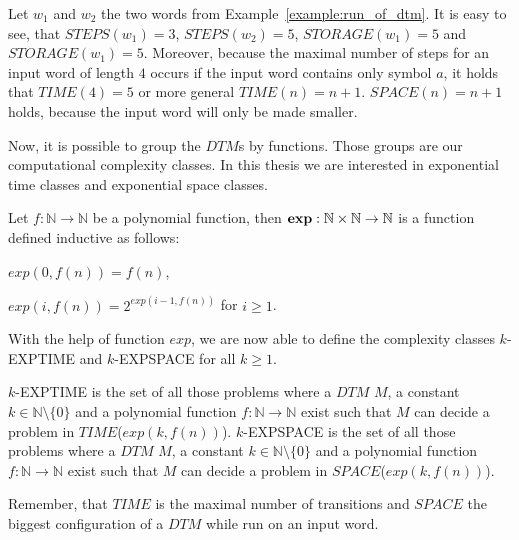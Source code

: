 \begin{example}
    \label{example:time_and_space}
    Let $w_1$ and $w_2$ the two words from Example~\ref{example:run_of_dtm}. It is easy to see, that $\mathit{STEPS}
    (w_1) = 3$, $\mathit{STEPS}(w_2) = 5$, $\mathit{STORAGE}(w_1) = 5$ and $\mathit{STORAGE}(w_1) = 5$. Moreover,
    because the maximal number of steps for an input word of length $4$ occurs if the input word contains only symbol
    $a$, it holds that $\mathit{TIME}(4) = 5$ or more general $\mathit{TIME}(n) = n + 1$. $\mathit{SPACE}(n) = n + 1$
    holds, because the input word will only be made smaller.
\end{example}

Now, it is possible to group the $\mathit{DTM}$s by functions. Those groups are our computational complexity classes.
In this thesis we are interested in exponential time classes and exponential space classes.

\begin{definition}
    Let $f: \mathbb{N} \rightarrow \mathbb{N}$ be a polynomial function, then $\emph{exp}: \mathbb{N} \times \mathbb{N}
    \rightarrow \mathbb{N}$ is a function defined inductive as follows:
    \begin{compactitem}
        \item $exp(0, f(n)) = f(n)$,
        \item $exp(i, f(n)) = 2^{exp(i - 1, f(n))}$ for $i \geq 1$.
    \end{compactitem}
\end{definition}

With the help of function $exp$, we are now able to define the complexity classes $k$-EXPTIME and $k$-EXPSPACE for
all $k \geq 1$.

\begin{definition}
    $k$-EXPTIME is the set of all those problems where a $\mathit{DTM}$ $M$, a constant $k \in \mathbb{N}
    \setminus\{0\}$ and a polynomial function $f: \mathbb{N} \rightarrow \mathbb{N}$ exist such that
    $M$ can decide a problem in $\mathit{TIME}$($exp(k, f(n))$).
    $k$-EXPSPACE is the set of all those problems where a $\mathit{DTM}$ $M$, a constant $k \in \mathbb{N}
    \setminus\{0\}$ and a polynomial function $f: \mathbb{N} \rightarrow \mathbb{N}$ exist such that
    $M$ can decide a problem in $\mathit{SPACE}$($exp(k, f(n))$).
\end{definition}

Remember, that $\mathit{TIME}$ is the maximal number of transitions and $\mathit{SPACE}$ the biggest configuration of a
$\mathit{DTM}$ while run on an input word.

